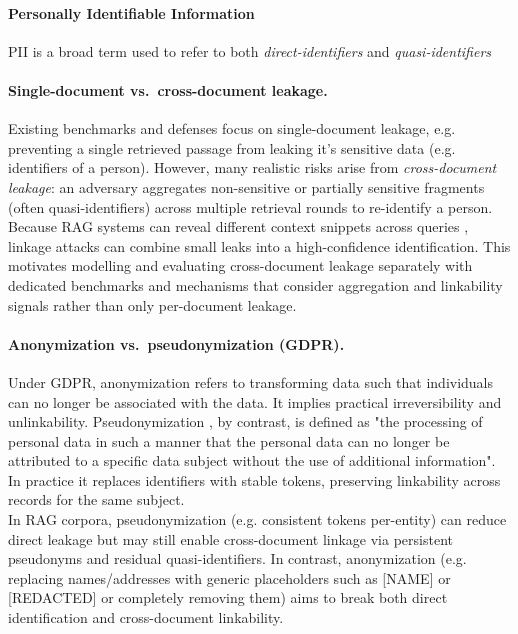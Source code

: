 \paragraph{Personally Identifiable Information}
\ac{PII} is a broad term used to refer to both \textit{direct-identifiers} and \textit{quasi-identifiers}

\paragraph{Single-document vs.\ cross-document leakage.}
Existing benchmarks and defenses focus on single-document leakage, e.g. preventing a single retrieved passage from leaking it's sensitive data (e.g. identifiers of a person). \cite{ragSAGE, goodAndBad}  However, many realistic risks arise from \textit{cross-document leakage}: an  adversary aggregates non-sensitive or partially sensitive fragments (often quasi-identifiers) across multiple retrieval rounds to re-identify a person. \\
Because RAG systems can reveal different context snippets across queries \cite{ragThief}, linkage attacks can combine small leaks into a high-confidence identification.
This motivates modelling and evaluating cross-document leakage separately with dedicated benchmarks and mechanisms that consider aggregation and linkability signals rather than only per-document leakage.


\paragraph{Anonymization vs.\ pseudonymization (GDPR).}
Under GDPR, anonymization refers to transforming data such that individuals can no longer be associated with the data. It implies practical irreversibility and unlinkability. Pseudonymization , by contrast, is defined as "the processing of personal data in such a manner that the personal data can no longer be attributed to a specific data subject without the use of additional information". \cite{anonDefinition} In practice it replaces identifiers with stable tokens, preserving linkability across records for the same subject.\\
In \ac{RAG} corpora, pseudonymization (e.g. consistent tokens per-entity) can reduce direct leakage but may still enable cross-document linkage via persistent pseudonyms and residual quasi-identifiers. In contrast, anonymization (e.g. replacing names/addresses with generic placeholders such as [NAME] or [REDACTED] or completely removing them) aims to break both direct identification and cross-document linkability.

